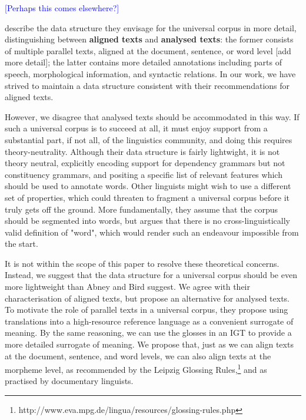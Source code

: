 \textcolor{blue}{[Perhaps this comes elsewhere?]}

 describe the data structure they envisage for the universal corpus in more detail, distinguishing between \textbf{aligned texts} and \textbf{analysed texts}: the former consists of multiple parallel texts, aligned at the document, sentence, or word level [add more detail]; the latter contains more detailed annotations including parts of speech, morphological information, and syntactic relations. In our work, we have strived to maintain a data structure consistent with their recommendations for aligned texts.

However, we disagree that analysed texts should be accommodated in this way. If such a universal corpus is to succeed at all, it must enjoy support from a substantial part, if not all, of the linguistics community, and doing this requires theory-neutrality. Although their data structure is fairly lightwight, it is not theory neutral, explicitly encoding support for dependency grammars but not constituency grammars, and positing a specific list of relevant features which should be used to annotate words. Other linguists might wish to use a different set of properties, which could threaten to fragment a universal corpus before it truly gets off the ground. More fundamentally, they assume that the corpus should be segmented into words, but  argues that there is no cross-linguistically valid definition of "word", which would render such an endeavour impossible from the start.

It is not within the scope of this paper to resolve these theoretical concerns. Instead, we suggest that the data structure for a universal corpus should be even more lightweight than Abney and Bird suggest. We agree with their characterisation of aligned texts, but propose an alternative for analysed texts. To motivate the role of parallel texts in a universal corpus, they propose using translations into a high-resource reference language as a convenient surrogate of meaning. By the same reasoning, we can use the glosses in an IGT to provide a more detailed surrogate of meaning. We propose that, just as we can align texts at the document, sentence, and word levels, we can also align texts at the morpheme level, as recommended by the Leipzig Glossing Rules,\footnote{http://www.eva.mpg.de/lingua/resources/glossing-rules.php} and as practised by documentary linguists.

